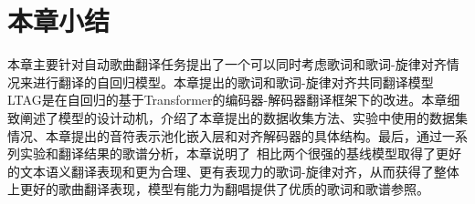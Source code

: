 \section{本章小结}
本章主要针对自动歌曲翻译任务提出了一个可以同时考虑歌词和歌词-旋律对齐情况来进行翻译的自回归模型。本章提出的歌词和歌词-旋律对齐共同翻译模型LTAG是在自回归的基于Transformer的编码器-解码器翻译框架下的改进。本章细致阐述了模型的设计动机，介绍了本章提出的数据收集方法、实验中使用的数据集情况、本章提出的音符表示池化嵌入层和对齐解码器的具体结构。最后，通过一系列实验和翻译结果的歌谱分析，本章说明了\modelname~相比两个很强的基线模型取得了更好的文本语义翻译表现和更为合理、更有表现力的歌词-旋律对齐，从而获得了整体上更好的歌曲翻译表现，模型有能力为翻唱提供了优质的歌词和歌谱参照。
